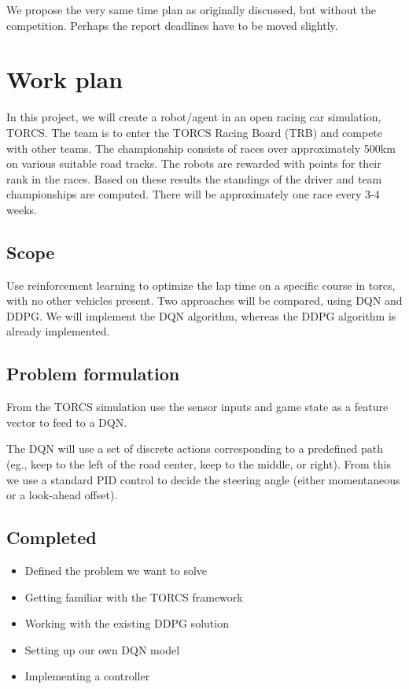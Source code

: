 \documentclass{article}
\begin{document}
We propose the very same time plan as originally discussed, but without the competition. Perhaps the report deadlines have to be moved slightly.

\section{Work plan}

In this project, we will create a robot/agent in an open racing car simulation, TORCS. The team is to enter the TORCS Racing Board (TRB) and compete with other teams. The championship consists of races over approximately 500km on various suitable road tracks. The robots are rewarded with points for their rank in the races. Based on these results the standings of the driver and team championships are computed. There will be approximately one race every 3-4 weeks.

\subsection{Scope}
Use reinforcement learning to optimize the lap time on a specific course in torcs, with no other vehicles present. Two approaches will be compared, using DQN and DDPG. We will implement the DQN algorithm, whereas the DDPG algorithm is already implemented.

\subsection{Problem formulation}
From the TORCS simulation use the sensor inputs and game state as a feature vector to feed to a DQN. 

The DQN will use a set of discrete actions corresponding to a predefined path (eg., keep to the left of the road center, keep to the middle, or right). From this we use a standard PID control to decide  the steering angle (either momentaneous or a look-ahead offset).

\subsection{Completed}

\begin{itemize}
	\item Defined the problem we want to solve
	\item Getting familiar with the TORCS framework
	\item Working with the existing DDPG solution
	\item Setting up our own DQN model
	\item Implementing a controller
\end{itemize}
\end{document}
